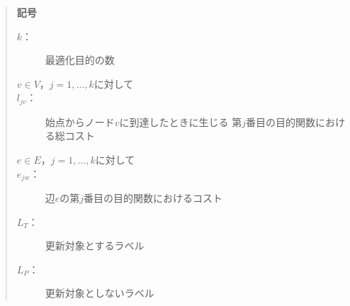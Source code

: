 \documentclass[12pt]{optlab-bachelor}
\begin{document}
\begin{quote}
  \textbf{記号}
  \begin{description}
    \item[$k$：] 最適化目的の数
    \item[$v \in V$，$j = 1 , \ldots , k$に対して]
    \item[$l_{jv}$：] 始点からノード$v$に到達したときに生じる
    第$j$番目の目的関数における総コスト
    \item[$e \in E$，$j = 1 , \ldots , k$に対して]
    \item[$e_{jw}$：] 辺$e$の第$j$番目の目的関数におけるコスト
    \item[$L_T$：] 更新対象とするラベル
    \item[$L_P$：] 更新対象としないラベル
  \end{description}
\end{quote}
\end{document}
